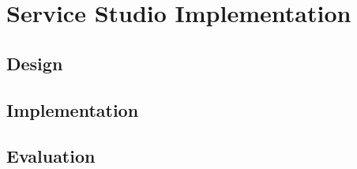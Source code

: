 
\section{Service Studio Implementation}
\label{sec:service_studio_implementation}

\subsection{Design}
\label{subsec:service_studio_design}


\subsection{Implementation}
\label{subsec:service_studio_implementation}

\subsection{Evaluation}
\label{subsec:service_studio_evaluation}

